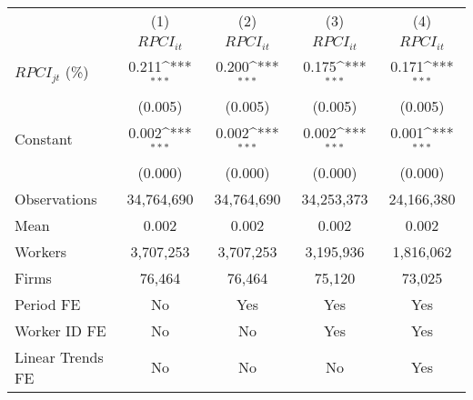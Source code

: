 {
\def\sym#1{\ifmmode^{#1}\else\(^{#1}\)\fi}
\begin{tabular}{l*{4}{c}}
\hline\hline
                    &\multicolumn{1}{c}{(1)}&\multicolumn{1}{c}{(2)}&\multicolumn{1}{c}{(3)}&\multicolumn{1}{c}{(4)}\\
                    &\multicolumn{1}{c}{$RPCI_{it}$}&\multicolumn{1}{c}{$RPCI_{it}$}&\multicolumn{1}{c}{$RPCI_{it}$}&\multicolumn{1}{c}{$RPCI_{it}$}\\
\hline
$RPCI_{jt}$ (\%)    &       0.211\sym{***}&       0.200\sym{***}&       0.175\sym{***}&       0.171\sym{***}\\
                    &     (0.005)         &     (0.005)         &     (0.005)         &     (0.005)         \\
[1em]
Constant            &       0.002\sym{***}&       0.002\sym{***}&       0.002\sym{***}&       0.001\sym{***}\\
                    &     (0.000)         &     (0.000)         &     (0.000)         &     (0.000)         \\
\hline
Observations        &  34,764,690         &  34,764,690         &  34,253,373         &  24,166,380         \\
Mean                &       0.002         &       0.002         &       0.002         &       0.002         \\
Workers             &   3,707,253         &   3,707,253         &   3,195,936         &   1,816,062         \\
Firms               &      76,464         &      76,464         &      75,120         &      73,025         \\
Period FE           &          No         &         Yes         &         Yes         &         Yes         \\
Worker ID FE        &          No         &          No         &         Yes         &         Yes         \\
Linear Trends FE    &          No         &          No         &          No         &         Yes         \\
\hline\hline
\end{tabular}
}
